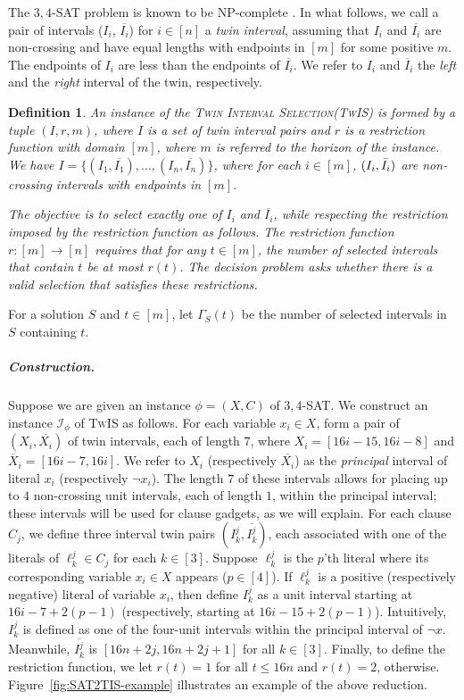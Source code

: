 \documentclass[letterpaper,11pt]{article}
\newtheorem{definition}[theorem]{Definition}
\newcommand{\sssattt}{\textsc{$3,4$-SAT}\xspace}
\newcommand{\tis}{\textsc{TwIS}\xspace}
\newcommand{\tislong}{\textsc{Twin Interval Selection}\xspace}
\begin{document}
The \sssattt problem is known to be NP-complete \cite{tovey1984simplified}. 
In what follows, we call a pair of intervals ($I_i$, $\overline{I_i}$) for $i\in [n]$ a \emph{twin interval}, assuming that $I_i$ and $\overline{I_i}$ are non-crossing and have equal lengths with endpoints in $[m]$ for some positive $m$. The endpoints of $I_i$ are less than the endpoints of $\overline{I_i}$. We refer to $I_i$ and $\overline{I}_i$ the \emph{left} and the \emph{right} interval of the twin, respectively.

\begin{definition}

An instance of the \emph{\tislong (\tis)} is formed by a tuple $(I,r,m)$, where $I$ is a set of \emph{twin} interval pairs and $r$ is a \emph{restriction function} with domain $[m]$, where $m$ is referred to the \emph{horizon} of the instance. We have $I = \{(I_1, \overline{I_1}), \ldots, (I_n, \overline{I_n})\}$, where  for each $i\in [m]$, $(I_i, \Bar{I_i})$ are non-crossing intervals with endpoints in $[m]$.

The objective is to select exactly one of $I_i$ and $\overline{I_i}$, while respecting the restriction imposed by the restriction function as follows. The restriction function $r : [m] \to [n]$ requires that for any $t \in [m]$, the number of selected intervals that contain $t$ be at most $r(t)$. The decision problem asks whether there is a valid selection that satisfies these restrictions. 
\end{definition}
For a solution $S$ and $t\in[m]$, let $\Gamma_S(t)$ be the number of selected intervals in $S$ containing $t$.







\subparagraph*{Construction.} 
Suppose we are given an instance $\phi=(X, C)$ of \sssattt. We construct an instance $\mathcal{I}_\phi$ of \tis as follows. 
For each variable $x_i \in X$, 
form a pair of $(X_i,\overline{X_i})$ of twin intervals, each of length $7$, where $X_i = [16i - 15, 16i - 8]$ and 
$\overline{X}_i = [16i - 7, 16i]$. 
We refer to $X_i$ (respectively $\overline{X_i}$) as the \emph{principal} interval of literal $x_i$ (respectively $\neg x_i$). 
The length $7$ of these intervals allows for placing up to $4$ non-crossing unit intervals, each of length $1$, within the principal interval; these intervals will be used for clause gadgets, as we will explain.
For each clause $C_j$, we define three interval twin pairs $(I_k^j,\overline{I_k^j})$, each associated with one of the literals of $\ell^j_k\in C_j$ for each $k\in[3]$. Suppose $\ell^j_k$ is the $p$'th literal where its corresponding variable $x_i\in X$ appears ($p\in[4]$). If $\ell^j_k$ is a positive (respectively negative) literal of variable $x_i$, 
 then define $I_k^j$ as a unit interval starting at $16i-7+2(p-1)$ 
 (respectively, starting at $16i-15+2(p-1)$).
Intuitively, $I_k^j$ is defined as one of the four-unit intervals within the principal interval of $\neg x$.
Meanwhile, $\overline{I_k^j}$ is $[16n+2j, 16n+2j+1]$ for all $k \in [3]$. 
Finally, to define the restriction function, we let $r(t)=1$ for all $t\leq 16n$ and $r(t)=2$, otherwise. Figure~\ref{fig:SAT2TIS-example} illustrates an example of the above reduction. 
\end{document}
